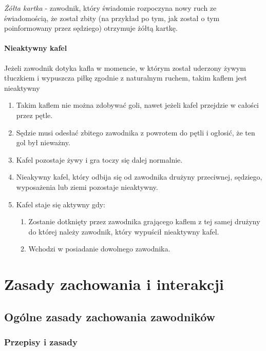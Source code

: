 \documentclass[12pt]{article}
\begin{document}
\emph{Żółta kartka} - zawodnik, który świadomie rozpoczyna nowy ruch ze
świadomością, że został zbity (na przykład po tym, jak został o tym
poinformowany przez sędziego) otrzymuje żółtą kartkę.

\paragraph{Nieaktywny kafel}
Jeżeli zawodnik dotyka kafla w
momencie, w którym został uderzony żywym tłuczkiem i wypuszcza piłkę
zgodnie z naturalnym ruchem, takim kaflem jest nieaktywny

\begin{enumerate}
\item
    Takim kaflem nie można zdobywać goli, nawet jeżeli kafel przejdzie w
  całości przez pętle.
  \item
    Sędzie musi odesłać zbitego zawodnika z powrotem do pętli i ogłosić,
  że ten gol był nieważny.
  \item
    Kafel pozostaje żywy i gra toczy się dalej normalnie.
  \item
    Nieakywny kafel, który odbija się od zawodnika drużyny przeciwnej,
  sędziego, wyposażenia lub ziemi pozostaje nieaktywny.
  \item
    Kafel staje się aktywny gdy:
  
  \begin{enumerate}
  \item
        Zostanie dotknięty przez zawodnika grającego kaflem z tej samej
    drużyny do której należy zawodnik, który wypuścił nieaktywny kafel.
      \item
        Wchodzi w posiadanie dowolnego zawodnika.
      \end{enumerate}
\end{enumerate}

\pagebreak
\section{Zasady zachowania i interakcji}

\subsection{Ogólne zasady zachowania zawodników}

\subsubsection{Przepisy i zasady}
\end{document}
